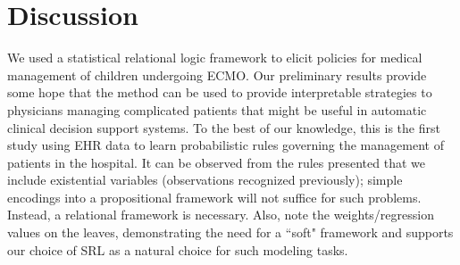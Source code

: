 \documentclass[letterpaper]{article}
\begin{document}

\section{Discussion}
We used a statistical relational logic framework to elicit policies for medical management of children undergoing ECMO. Our preliminary results provide some hope that the method can be used to provide interpretable strategies to physicians managing complicated patients that might be useful in automatic clinical decision support systems. To the best of our knowledge, this is the first study using EHR data to learn probabilistic rules governing the management of patients in the hospital. It can be observed from the rules presented that we include existential variables (observations recognized previously); simple encodings into a propositional framework will not suffice for such problems. Instead, a relational framework is necessary. Also, note the weights/regression values on the leaves, demonstrating the need for a ``soft" framework and supports our choice of SRL as a natural choice for such modeling tasks.
\end{document}
